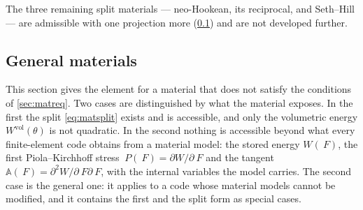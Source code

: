 \documentclass{article}
\newcommand{\F}{~F}
\renewcommand{\P}{~P}
\newcommand{\supvol}{^{\mathrm{vol}}}
\theoremstyle{definition}
\theoremstyle{plain}
\begin{document}
The three remaining split materials --- neo-Hookean, its reciprocal, and
Seth--Hill --- are admissible with one projection more
(\cref{sec:general}) and are not developed further.

\subsection{General materials}
\label{sec:general}

This section gives the element for a material that does not satisfy the
conditions of \cref{sec:matreq}. Two cases are distinguished by what the
material exposes. In the first the split \eqref{eq:matsplit} exists and is
accessible, and only the volumetric energy $W\supvol(\theta)$ is not
quadratic. In the second nothing is accessible beyond what every
finite-element code obtains from a material model: the stored energy
$W(\F)$, the first Piola--Kirchhoff stress $\P(\F) = \partial W/\partial\F$
and the tangent $\mathbb{A}(\F) = \partial^2 W/\partial\F\partial\F$, with
the internal variables the model carries. The second case is the general
one: it applies to a code whose material models cannot be modified, and it
contains the first and the split form as special cases.
\end{document}
